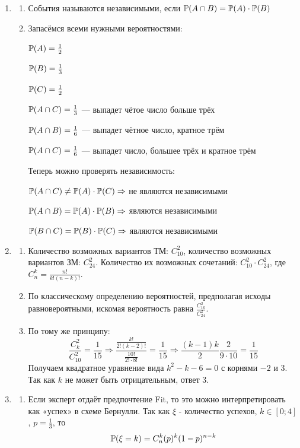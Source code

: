 \begin{enumerate}
\item
\begin{enumerate}
\item События называются независимыми, если  $\P(A \cap B) = \P(A) \cdot \P(B)$
\item Запасёмся всеми нужными вероятностями:

$\P(A) = \frac{1}{2}$

$\P(B) = \frac{1}{3}$

$\P(C) = \frac{1}{2}$

$\P(A \cap C) = \frac{1}{3} $ — выпадет чётое число больше трёх

$\P(A \cap B)  = \frac{1}{6}$ — выпадет чётное число, кратное трём

$\P(A \cap C) = \frac{1}{6}$ — выпадет число, большее трёх и кратное трём

Теперь можно проверять независимость:

$\P(A \cap C) \neq \P(A) \cdot \P(C) \Rightarrow$  не являются независимыми

$ \P(A \cap B) = \P(A) \cdot \P(B) \Rightarrow$ являются независимыми

$ \P(B \cap C) = \P(B) \cdot \P(C) \Rightarrow$ являются независимыми

\end{enumerate}
\item
\begin{enumerate}
\item Количество возможных вариантов ТМ: $ C_{10}^2 $,  количество возможных
вариантов ЗМ: $ C_{24}^2 $. Количество их возможных сочетаний: $ C_{10}^2 \cdot C_{24}^2$,
где $ C_n^k = \frac{n!}{k!(n-k)!}$.
\item По классическому определению вероятностей, предполагая исходы равновероятными,
искомая вероятность равна $\frac{C_{16}^2}{C_{24}^2}$.
\item По тому же принципу:
\[
\frac{C_k^2}{C_{10}^2} = \frac{1}{15} \Rightarrow \frac{\frac{k!}{2!(k-2)!}}{\frac{10!}{2! \cdot 8!}} = \frac{1}{15} \Rightarrow \frac{(k-1)k}{2}\frac{ 2}{9 \cdot 10} = \frac{1}{15}
\]
Получаем квадратное уравнение вида $ k^2 - k - 6 = 0 $ с корнями $-2$ и $3$.
Так как $k$ не может быть отрицательным, ответ $3$.
\end{enumerate}
\item
\begin{enumerate}
\item Если эксперт отдаёт предпочтение Fit, то это можно интерпретировать как
«успех» в схеме Бернулли. Так как $\xi$ - количество успехов,
$ k \in [0;4]$, $p = \frac{1}{3} $, то
\[
\P(\xi = k) = C_n^k(p)^k(1-p)^{n-k}
\]


\end{enumerate}
\end{enumerate}
